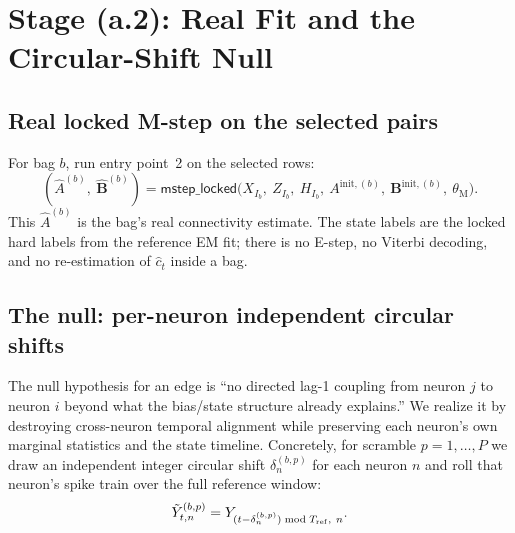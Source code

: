 \documentclass[11pt]{article}
\begin{document}
\section{Stage (a.2): Real Fit and the Circular-Shift Null}
\label{sec:null}

\subsection{Real locked M-step on the selected pairs}

For bag \(b\), run entry point~2 on the selected rows:
\[
(\hat A^{(b)},\ \hat{\mathbf B}^{(b)})
=\textsf{mstep\_locked}\!\big(
X_{I_b},\ Z_{I_b},\ H_{I_b},\
A^{\text{init},(b)},\ \mathbf B^{\text{init},(b)},\ \theta_{\text{M}}\big).
\]
This \(\hat A^{(b)}\) is the bag's real connectivity estimate. The state
labels are the locked hard labels from the reference EM fit; there is no
E-step, no Viterbi decoding, and no re-estimation of \(\hat c_t\) inside a
bag.

\subsection{The null: per-neuron independent circular shifts}

The null hypothesis for an edge is ``no directed lag-1 coupling from neuron
\(j\) to neuron \(i\) beyond what the bias/state structure already explains.''
We realize it by destroying cross-neuron temporal alignment while preserving
each neuron's own marginal statistics and the state timeline. Concretely,
for scramble \(p=1,\dots,P\) we draw an independent integer circular shift
\(\delta_n^{(b,p)}\) for each neuron \(n\) and roll that neuron's spike
train over the full reference window:
\[
\tilde Y^{(b,p)}_{t,n}
=Y_{(t-\delta_n^{(b,p)})\bmod T_{\rm ref},\ n}.
\]
\end{document}
